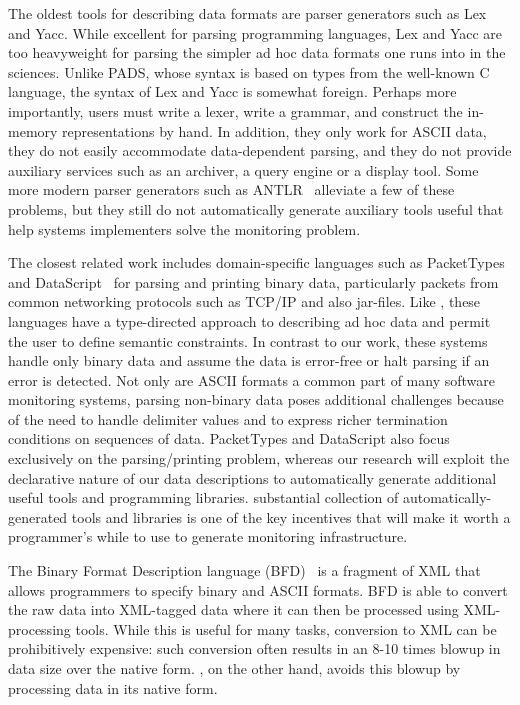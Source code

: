 The oldest tools for describing data formats are parser generators such as
Lex and Yacc.  While excellent for parsing programming languages, Lex and Yacc
are too heavyweight for parsing the simpler ad hoc data formats one
runs into in the sciences.   
Unlike PADS, whose syntax is based on types from the well-known C language,
the syntax of Lex and Yacc is somewhat foreign.  Perhaps more importantly,
users must write a lexer, write a
grammar, and construct the in-memory representations by hand.  In
addition, they only work for ASCII data, they do not easily
accommodate data-dependent parsing, and they do not provide auxiliary
services such as an archiver, a query engine or a display tool.
Some more modern parser generators such as ANTLR~\cite{antlr} alleviate
a few of these problems, but they still do not automatically generate auxiliary tools
useful that help systems implementers solve the monitoring problem. 

The closest related work includes domain-specific
languages such as PacketTypes~\cite{sigcomm00} and DataScript~\cite{gpce02} 
for parsing and printing binary data, particularly packets
from common networking protocols such as \textsc{TCP/IP} and also
\java{} jar-files.  Like \pads{}, these languages have a type-directed
approach to describing ad hoc data and permit the user to define
semantic constraints.  In contrast to our work, these systems handle
only binary data and assume the data is error-free or halt parsing if
an error is detected.  Not only are ASCII formats a common part of
many software monitoring systems, parsing non-binary data poses additional
challenges because of the need to handle delimiter values and to
express richer termination conditions on sequences of data. 
PacketTypes and DataScript also focus exclusively on the 
parsing/printing problem,
whereas our research will exploit the declarative nature of our data
descriptions to automatically generate additional useful tools and
programming libraries.  \pads{} substantial 
collection of automatically-generated tools and libraries is 
one of the key incentives that will make it
worth a programmer's while to use \pads to generate monitoring infrastructure.

The Binary Format Description language (BFD)~\cite{bfd} is a fragment of
XML that allows programmers to specify binary and ASCII formats.  BFD
is able to convert the raw data into XML-tagged data where it can then be
processed using XML-processing tools.  While this is useful for many
tasks, conversion to XML can be prohibitively expensive:  such conversion
often results in an 8-10 times blowup in data size over the native form.
\pads{}, on the other hand, avoids this blowup by processing data in its 
native form.


